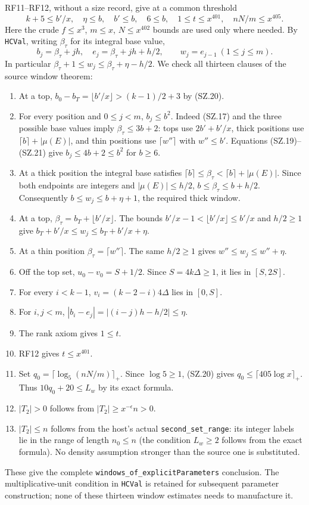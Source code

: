 RF11--RF12, without a size record, give at a common threshold
\[
 k+5\leq b'/x,\quad \eta\leq b,\quad b'\leq b,\quad
 6\leq b,\quad1\leq t\leq x^{401},\quad nN/m\leq x^{405}.
                                                                    \tag{SZ.20}
\]
Here the crude $f\leq x^3$, $m\leq x$, $N\leq x^{402}$
bounds are used only where needed. By \texttt{HCVal}, writing
$\beta_\tau$ for its integral base value,
\[
 b_j=\beta_\tau+jh,\quad e_j=\beta_\tau+jh+h/2,
       \qquad w_j=e_{j-1}\ (1\leq j\leq m).                  \tag{SZ.21}
\]
In particular
$\beta_\tau+1\leq w_j\leq\beta_\tau+\eta-h/2$.
We check all thirteen clauses of the source window theorem:
\begin{enumerate}
\item At a top,
$b_0-b_T=\lfloor b'/x\rfloor>(k-1)/2+3$ by (SZ.20).
\item For every position and $0\leq j<m$, $b_j\leq b^2$.
Indeed (SZ.17) and the three possible base values imply
$\beta_\tau\leq3b+2$: tops use $2b'+b'/x$, thick positions
use $\lceil b\rceil+|\mu(E)|$, and thin positions use
$\lceil w''\rceil$ with $w''\leq b'$. Equations
(SZ.19)--(SZ.21) give $b_j\leq4b+2\leq b^2$ for $b\geq6$.
\item At a thick position the integral base satisfies
$\lceil b\rceil\leq\beta_\tau<\lceil b\rceil+|\mu(E)|$.
Since both endpoints are integers and $|\mu(E)|\leq h/2$,
$b\leq\beta_\tau\leq b+h/2$. Consequently
$b\leq w_j\leq b+\eta+1$, the required thick window.
\item At a top,
$\beta_\tau=b_T+\lfloor b'/x\rfloor$. The bounds
$b'/x-1<\lfloor b'/x\rfloor\leq b'/x$ and $h/2\geq1$
give $b_T+b'/x\leq w_j\leq b_T+b'/x+\eta$.
\item At a thin position $\beta_\tau=\lceil w''\rceil$.
The same $h/2\geq1$ gives $w''\leq w_j\leq w''+\eta$.
\item Off the top set, $u_0-v_0=S+1/2$.
Since $S=4k\Delta\geq1$, it lies in $[S,2S]$.
\item For every $i<k-1$,
$v_i=(k-2-i)4\Delta$ lies in $[0,S]$.
\item For $i,j<m$,
$|b_i-e_j|=|(i-j)h-h/2|\leq\eta$.
\item The rank axiom gives $1\leq t$.
\item RF12 gives $t\leq x^{401}$.
\item Set $q_0=\lceil\log_5(nN/m)\rceil_+$. Since
$\log5\geq1$, (SZ.20) gives
$q_0\leq\lceil405\log x\rceil_+$. Thus
$10q_0+20\leq L_w$ by its exact formula.
\item $|T_2|>0$ follows from $|T_2|\geq x^{-\epsilon}n>0$.
\item $|T_2|\leq n$ follows from the host's actual
\texttt{second\_set\_range}: its integer labels lie in the range
of length $n_0\leq n$ (the condition $L_w\geq2$ follows from
the exact formula). No density assumption stronger than the source
one is substituted.
\end{enumerate}
These give the complete \texttt{windows\_of\_explicitParameters}
conclusion. The multiplicative-unit condition in \texttt{HCVal}
is retained for subsequent parameter construction; none of these
thirteen window estimates needs to manufacture it.

